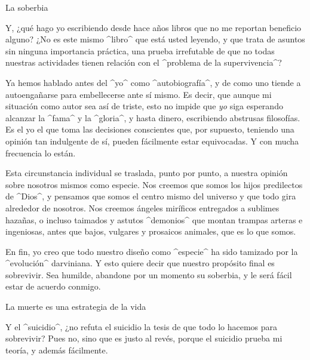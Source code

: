 \Section La soberbia

Y, ¿qué hago yo escribiendo desde hace años libros que no me reportan
beneficio alguno? ¿No es este mismo ^libro^ que está usted leyendo, y
que trata de asuntos sin ninguna importancia práctica, una prueba
irrefutable de que no todas nuestras actividades tienen relación con el
^problema de la supervivencia^?

Ya hemos hablado antes del ^yo^ como ^autobiografía^, y de como uno
tiende a autoengañarse para embellecerse ante sí mismo. Es decir, que
aunque mi situación como autor sea así de triste, esto no impide que
{\em yo} siga esperando alcanzar la ^fama^ y la ^gloria^, y hasta
dinero, escribiendo abstrusas filosofías. Es el yo el que toma las
decisiones conscientes que, por supuesto, teniendo una opinión tan
indulgente de sí, pueden fácilmente estar equivocadas. Y con mucha
frecuencia lo están.

Esta circunstancia individual se traslada, punto por punto, a nuestra
opinión sobre nosotros mismos como especie. Nos creemos que somos los
hijos predilectos de ^Dios^, y pensamos que somos el centro mismo del
universo y que todo gira alrededor de nosotros. Nos creemos ángeles
miríficos entregados a sublimes hazañas, o incluso taimados y astutos
^demonios^ que montan trampas arteras e ingeniosas, antes que bajos,
vulgares y prosaicos animales, que es lo que somos.

En fin, yo creo que todo nuestro diseño como ^especie^ ha sido tamizado
por la ^evolución^ darviniana. Y esto quiere decir que nuestro propósito
final es sobrevivir. Sea humilde, abandone por un momento su soberbia, y
le será fácil estar de acuerdo conmigo.


\Section La muerte es una estrategia de la vida

Y el ^suicidio^, ¿no refuta el suicidio la tesis de que todo lo hacemos
para sobrevivir? Pues no, sino que es justo al revés, porque el suicidio
prueba mi teoría, y además fácilmente.

